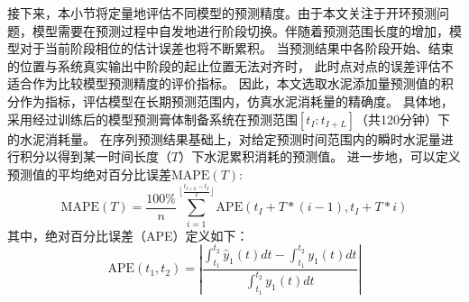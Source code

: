接下来，本小节将定量地评估不同模型的预测精度。由于本文关注于开环预测问题，模型需要在预测过程中自发地进行阶段切换。伴随着预测范围长度的增加，模型对于当前阶段相位的估计误差也将不断累积。
当预测结果中各阶段开始、结束的位置与系统真实输出中阶段的起止位置无法对齐时，
此时点对点的误差评估不适合作为比较模型预测精度的评价指标。
因此，本文选取水泥添加量预测值的积分作为指标，评估模型在长期预测范围内，仿真水泥消耗量的精确度。
具体地，采用经过训练后的模型预测膏体制备系统在预测范围$[{t_I:t_{I+L}}]$（共120分钟）下的水泥消耗量。
在序列预测结果基础上，对给定预测时间范围内的瞬时水泥量进行积分以得到某一时间长度（$T$）下水泥累积消耗的预测值。
进一步地，可以定义预测值的平均绝对百分比误差$\text{MAPE}(T)$:
\begin{equation}
\text{MAPE}(T) = \frac{100\%}{n}\sum\limits_{i=1}^{\lfloor\frac{t_{I+L}-t_I}{T}\rfloor}\text{APE}(t_I+T*(i-1),t_I+T*i)
\label{equ:energy_mape}
\end{equation}
其中，绝对百分比误差（APE）定义如下：
\begin{equation}
\text{APE}(t_1,t_2) = \left|\frac{\int_{t_1}^{t_2}\hat{y}_1(t)dt-\int_{t_1}^{t_2}y_1(t)dt}{\int_{t_1}^{t_2}y_1(t)dt}\right|
\end{equation}
